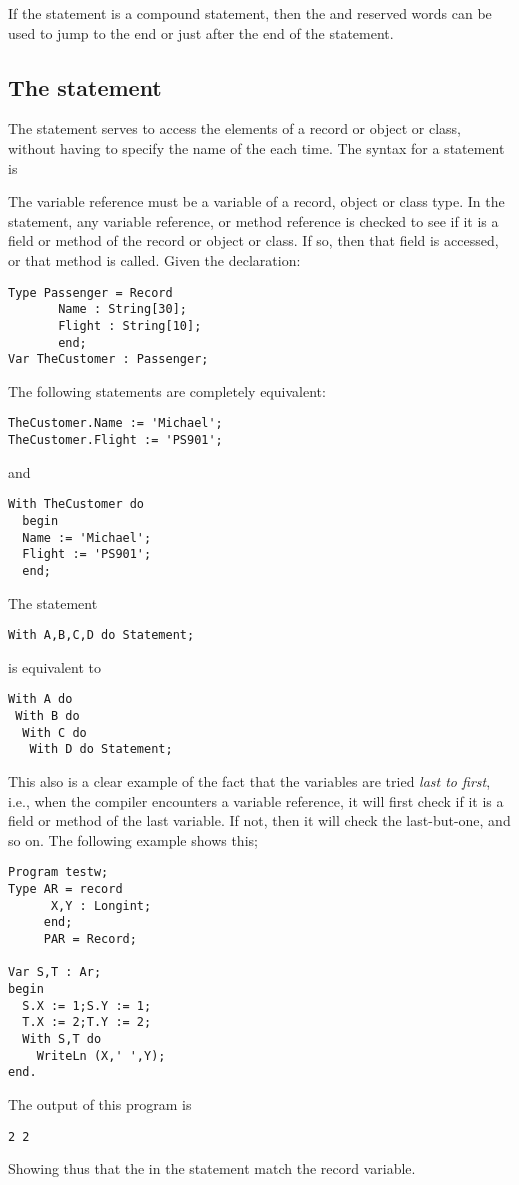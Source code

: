 If the statement is a compound statement, then  the  and
 reserved words can be used to jump to the end or just
after the end of the  statement.

\subsection{The  statement}
\label{se:With}
The  statement serves to access the elements of a record
or object or class, without having to specify the name of the each time.
The syntax for a  statement is

The variable reference must be a variable of a record, object or class type.
In the  statement, any variable reference, or method reference is
checked to see if it is a field or method of the record or object or class.
If so, then that field is accessed, or that method is called.
Given the declaration:
\begin{verbatim}
Type Passenger = Record
       Name : String[30];
       Flight : String[10];
       end;
Var TheCustomer : Passenger;
\end{verbatim}
The following statements are completely equivalent:
\begin{verbatim}
TheCustomer.Name := 'Michael';
TheCustomer.Flight := 'PS901';
\end{verbatim}
and
\begin{verbatim}
With TheCustomer do
  begin
  Name := 'Michael';
  Flight := 'PS901';
  end;
\end{verbatim}
The statement
\begin{verbatim}
With A,B,C,D do Statement;
\end{verbatim}
is equivalent to
\begin{verbatim}
With A do
 With B do
  With C do
   With D do Statement;
\end{verbatim}
This also is a clear example of the fact that the variables are tried {\em last
to first}, i.e., when the compiler encounters a variable reference, it will
first check if it is a field or method of the last variable. If not, then it
will check the last-but-one, and so on.
The following example shows this;
\begin{verbatim}
Program testw;
Type AR = record
      X,Y : Longint;
     end;
     PAR = Record;

Var S,T : Ar;
begin
  S.X := 1;S.Y := 1;
  T.X := 2;T.Y := 2;
  With S,T do
    WriteLn (X,' ',Y);
end.
\end{verbatim}
The output of this program is
\begin{verbatim}
2 2
\end{verbatim}
Showing thus that the  in the  statement match the
 record variable.

